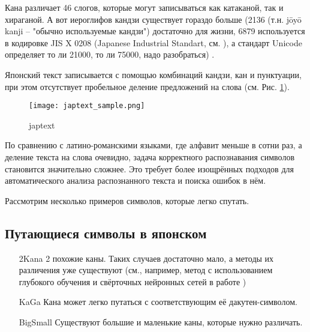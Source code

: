 Кана различает 46 слогов, которые могут записываться как катаканой, так и хираганой. А вот иероглифов кандзи существует гораздо больше (2136 (т.н. jōyō kanji -- "обычно используемые кандзи") достаточно для жизни, 6879 используется в кодировке JIS X 0208 (Japanese Industrial Standart, см. \cite{JISX0208}), а стандарт Unicode определяет то ли 21000, то ли 75000, надо разобраться) .

Японский текст записывается с помощью комбинаций кандзи, кан и пунктуации, при этом отсутствует пробельное деление предложений на слова (см. Рис. \ref{fig:japtext_sample}).
	\begin{figure}[H]
	\centering
	\texttt{[image: japtext\_sample.png]}
	\caption{japtext}
	\label{fig:japtext_sample}
\end{figure}

По сравнению с латино-романскими языками, где алфавит меньше в сотни раз, а деление текста на слова очевидно, задача корректного распознавания символов становится значительно сложнее. Это требует более изощрённых подходов для автоматического анализа распознанного текста и поиска ошибок в нём.

Рассмотрим несколько примеров символов, которые легко спутать.

\subsection{ Путающиеся символы в японском }

\begin{itemize}
	\item[2Kana] 2 похожие каны. Таких случаев достаточно мало, а методы их различения уже существуют (см., например, метод с использованием глубокого обучения и свёрточных нейронных сетей в работе \cite{tsai:dcnn})
	\begin{figure}[H]
	\end{figure}

	\item[KaGa] Кана может легко путаться с соответствующим её дакутен-символом.
	\begin{figure}[H]
	\end{figure}

	\item[BigSmall] Существуют большие и маленькие каны, которые нужно различать.
	\begin{figure}[H]
	\end{figure}
	
\end{itemize}


